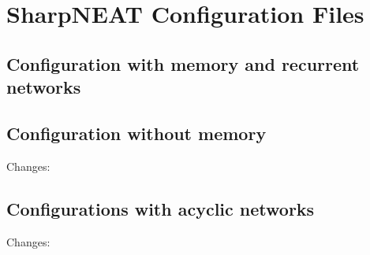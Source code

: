 \appendix
\section{SharpNEAT Configuration Files}
\label{appendix:sharpneat:configurations}
\subsection{Configuration with memory and recurrent networks}


\subsection{Configuration without memory}
Changes:



\subsection{Configurations with acyclic networks}
Changes:

